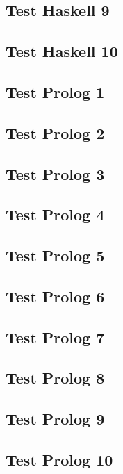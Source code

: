 \documentclass{article}
\begin{document}
\subsection*{Test Haskell 9}
\subsection*{Test Haskell 10}
\newpage
\subsection*{Test Prolog 1}
\subsection*{Test Prolog 2}
\subsection*{Test Prolog 3}
\subsection*{Test Prolog 4}
\subsection*{Test Prolog 5}
\subsection*{Test Prolog 6}
\subsection*{Test Prolog 7}
\subsection*{Test Prolog 8}
\subsection*{Test Prolog 9}
\subsection*{Test Prolog 10}
\newpage
\end{document}
